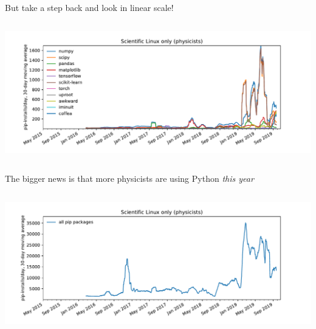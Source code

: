 \documentclass[aspectratio=169]{beamer}
\begin{document}
\begin{frame}{But take a step back and look in linear scale!}
\vspace{0.5 cm}
\begin{columns}
\includegraphics[width=\linewidth]{pip-scilinux-linear.pdf}
\end{columns}
\end{frame}

\begin{frame}{The bigger news is that more physicists are using Python {\it this year}}
\vspace{0.5 cm}
\begin{columns}
\includegraphics[width=\linewidth]{pip-scilinux-everything.pdf}
\end{columns}
\end{frame}
\end{document}
